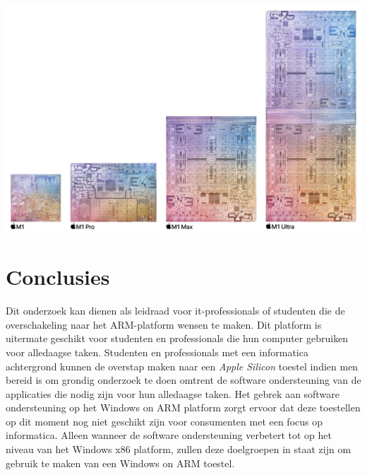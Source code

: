 \documentclass[a0,portrait]{a0poster}
\begin{document}
\begin{multicols}{2}
\begin{center}\vspace{1cm}
\includegraphics[width=1.0\linewidth]{Apple_M1_Ultra_Family.png}
\end{center}\vspace{1cm}




\color{HoGentAccent1} 
\section*{Conclusies}
\color{black}
Dit onderzoek kan dienen als leidraad voor it-professionals of studenten die de overschakeling naar het ARM-platform wensen te maken. Dit platform is uitermate geschikt voor studenten en professionals die hun computer gebruiken voor alledaagse taken. Studenten en professionals met een informatica achtergrond kunnen de overstap maken naar een \textit{Apple Silicon} toestel indien men bereid is om grondig onderzoek te doen omtrent de software ondersteuning van de applicaties die nodig zijn voor hun alledaagse taken. Het gebrek aan software ondersteuning op het Windows on ARM platform zorgt ervoor dat deze toestellen op dit moment nog niet geschikt zijn voor consumenten met een focus op informatica. Alleen wanneer de software ondersteuning verbetert tot op het niveau van het Windows x86 platform, zullen deze doelgroepen in staat zijn om gebruik te maken van een Windows on ARM toestel.
\color{HoGentAccent1} 

\end{multicols}
\end{document}
